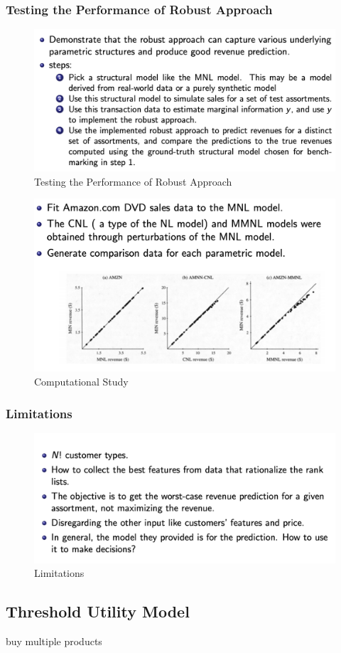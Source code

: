 \documentclass[11pt]{elegantbook}
\begin{document}
\subsubsection{ Testing the Performance of Robust Approach}
\begin{center}\begin{figure}[htbp]
    \centering
    \includegraphics[scale=0.5]{RLCM5.png}
    \caption{Testing the Performance of Robust Approach}
    \label{}
\end{figure}\end{center}
\begin{center}\begin{figure}[htbp]
    \centering
    \includegraphics[scale=0.5]{RLCM6.png}
    \caption{Computational Study}
    \label{}
\end{figure}\end{center}

\subsubsection{ Limitations}
\begin{center}\begin{figure}[htbp]
    \centering
    \includegraphics[scale=0.5]{RLCM7.png}
    \caption{Limitations}
    \label{}
\end{figure}\end{center}

\subsection{ Threshold Utility Model}
buy multiple products
\end{document}
